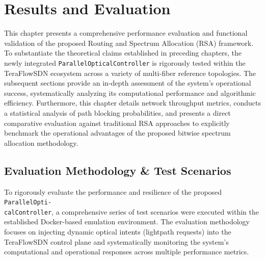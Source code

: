 \chapter{Results and Evaluation}
This chapter presents a comprehensive performance evaluation and functional validation of the proposed Routing and Spectrum Allocation (RSA) framework. To substantiate the theoretical claims established in preceding chapters, the newly integrated \texttt{ParallelOpticalController} is rigorously tested within the TeraFlowSDN ecosystem across a variety of multi-fiber reference topologies. The subsequent sections provide an in-depth assessment of the system's operational success, systematically analyzing its computational performance and algorithmic efficiency. Furthermore, this chapter details network throughput metrics, conducts a statistical analysis of path blocking probabilities, and presents a direct comparative evaluation against traditional RSA approaches to explicitly benchmark the operational advantages of the proposed bitwise spectrum allocation methodology.
\section{Evaluation Methodology \& Test Scenarios}
To rigorously evaluate the performance and resilience of the proposed \texttt{ParallelOpti-\\calController}, a comprehensive series of test scenarios were executed within the established Docker-based emulation environment. The evaluation methodology focuses on injecting dynamic optical intents (lightpath requests) into the TeraFlowSDN control plane and systematically monitoring the system's computational and operational responses across multiple performance metrics.

